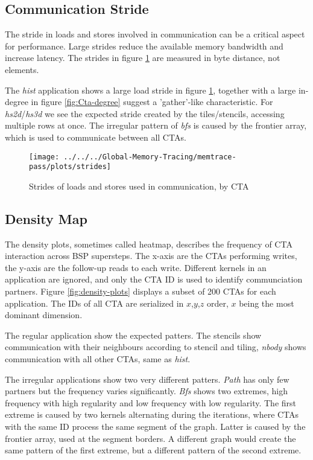 \subsection{Communication Stride}
The stride in loads and stores involved in communication can be a critical aspect for performance. Large strides reduce the available memory bandwidth and increase latency. The strides in figure \ref{com-stride} are measured in byte distance, not elements.

The \textit{hist} application shows a large load stride in figure \ref{com-stride}, together with a large in-degree in figure \ref{fig:Cta-degree} suggest a 'gather'-like characteristic. For \textit{hs2d}/\textit{hs3d} we see the expected stride created by the tiles/stencils, accessing multiple rows at once.
The irregular pattern of \textit{bfs} is caused by the frontier array, which is used to communicate between all CTAs.
\begin{figure}[t]
	\centering
	\texttt{[image: ../../../Global-Memory-Tracing/memtrace-pass/plots/strides]}
	\caption{Strides of loads and stores used in communication, by CTA}
	\label{com-stride}
\end{figure}
\subsection{Density Map}
The density plots, sometimes called heatmap, describes the frequency of CTA interaction across BSP supersteps. The x-axis are the CTAs performing writes, the y-axis are the follow-up reads to each write. Different kernels in an application are ignored, and only the CTA ID is used to identify communciation partners. Figure \ref{fig:density-plots} displays a subset of 200 CTAs for each application. The IDs of all CTA are serialized in $x$,$y$,$z$ order, $x$ being the most dominant dimension. 

The regular application show the expected patters. The stencils show communication with their neighbours according to stencil and tiling, \textit{nbody} shows communication with all other CTAs, same as \textit{hist}.

The irregular applications show two very different patters. \textit{Path} has only few partners but the frequency varies significantly. \textit{Bfs} shows two extremes, high frequency with high regularity and low frequency with low regularity.
The first extreme is caused by two kernels alternating during the iterations, where CTAs with the same ID process the same segment of the graph.  Latter is caused by the frontier array, used at the segment borders. A different graph would create the same pattern of the first extreme, but a different pattern of the second extreme.

